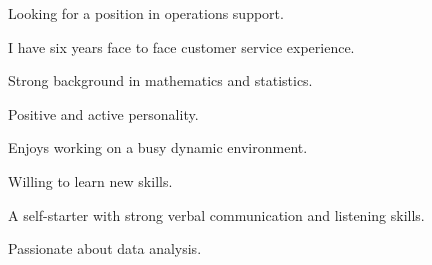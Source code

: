 

\begin{cventries}

  \cventry
    {} %
    {} %
    {} %
    {} %
    {
      \begin{cvitems} %
      \item Looking for a position in operations support.
      \item I have six years face to face customer service experience.
      \item Strong background in mathematics and statistics.
      \item Positive and active personality.
      \item Enjoys working on a busy dynamic environment.
      \item Willing to learn new skills.
      \item A self-starter with strong verbal communication and listening skills.
      \item Passionate about data analysis. 
      \end{cvitems}
    }


\end{cventries}
